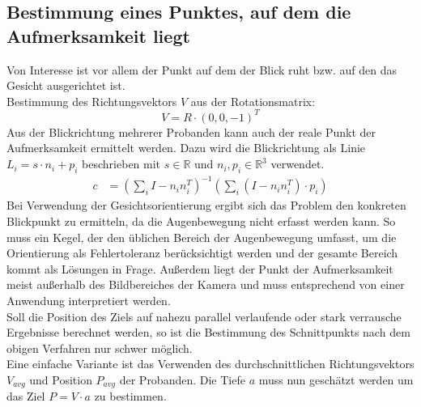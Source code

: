 \subsection{Bestimmung eines Punktes, auf dem die Aufmerksamkeit liegt}
Von Interesse ist vor allem der Punkt auf dem der Blick ruht bzw. auf den das Gesicht ausgerichtet ist.\\
Bestimmung des Richtungsvektors $V$ aus der Rotationsmatrix:
\[V= R\cdot (0,0,-1)^T\] 
Aus der Blickrichtung mehrerer Probanden kann auch der reale Punkt der Aufmerksamkeit ermittelt werden. Dazu wird die Blickrichtung als Linie $L_i = s \cdot n_i+ p_i$ beschrieben mit $s\in \mathbb{R}$ und $n_i,p_i \in \mathbb{R}^3$ verwendet.
\begin{align*}
c&=(\sum_{i} I -n_in_i^T)^{-1}
(\sum_{i} (I -n_in_i^T)\cdot p_i)
\end{align*}
Bei Verwendung der Gesichtsorientierung ergibt sich das Problem den konkreten Blickpunkt zu ermitteln, da die Augenbewegung nicht erfasst werden kann.
So muss ein Kegel, der den üblichen Bereich der Augenbewegung umfasst, um die Orientierung als Fehlertoleranz berücksichtigt werden und der gesamte Bereich kommt als Lösungen in Frage.
Außerdem liegt der Punkt der Aufmerksamkeit meist außerhalb des Bildbereiches der Kamera und muss entsprechend von einer Anwendung interpretiert werden.\\
Soll die Position des Ziels auf nahezu parallel verlaufende oder stark verrausche Ergebnisse berechnet werden, so ist die Bestimmung des Schnittpunkts nach dem obigen Verfahren nur schwer möglich.\\
Eine einfache Variante ist das Verwenden des durchschnittlichen Richtungsvektors $V_{avg}$ und Position $P_{avg}$ der Probanden. Die Tiefe $a$ muss nun geschätzt werden um das Ziel $P=V\cdot a$ zu bestimmen.